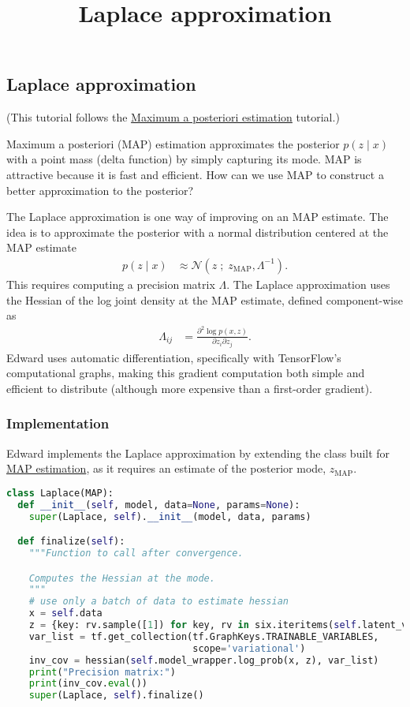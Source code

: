 \title{Laplace approximation}

\subsection{Laplace approximation}

(This tutorial follows the
\href{tut_MAP.html}{Maximum a posteriori estimation} tutorial.)

Maximum a posteriori (MAP) estimation approximates the posterior $p(z \mid x)$
with a point mass (delta function) by simply capturing its mode. MAP is
attractive because it is fast and efficient. How can we use MAP to construct a
better approximation to the posterior?

The Laplace approximation is one way of improving on an MAP estimate. The idea
is to approximate the posterior with a normal distribution centered at the MAP
estimate
\begin{align*}
  p(z \mid x)
  &\approx
  \mathcal{N}(z\;;\; z_\text{MAP}, \Lambda^{-1}).
\end{align*}
This requires computing a precision matrix $\Lambda$. The Laplace approximation
uses the Hessian of the log joint density at the MAP estimate,
defined component-wise as
\begin{align*}
  \Lambda_{ij}
  &=
  \frac{\partial^2 \log p(x, z)}{\partial z_i \partial z_j}.
\end{align*}
Edward uses automatic differentiation, specifically with TensorFlow's
computational graphs, making this gradient computation both simple and
efficient to distribute (although more expensive than a first-order
gradient).

\subsubsection{Implementation}

Edward implements the Laplace approximation by extending the class built for
\href{tut_MAP.html}{MAP estimation}, as it requires an estimate of the
posterior mode, $z_\text{MAP}$.

\begin{lstlisting}[language=Python]
class Laplace(MAP):
  def __init__(self, model, data=None, params=None):
    super(Laplace, self).__init__(model, data, params)

  def finalize(self):
    """Function to call after convergence.

    Computes the Hessian at the mode.
    """
    # use only a batch of data to estimate hessian
    x = self.data
    z = {key: rv.sample([1]) for key, rv in six.iteritems(self.latent_vars)}
    var_list = tf.get_collection(tf.GraphKeys.TRAINABLE_VARIABLES,
                                 scope='variational')
    inv_cov = hessian(self.model_wrapper.log_prob(x, z), var_list)
    print("Precision matrix:")
    print(inv_cov.eval())
    super(Laplace, self).finalize()
\end{lstlisting}

